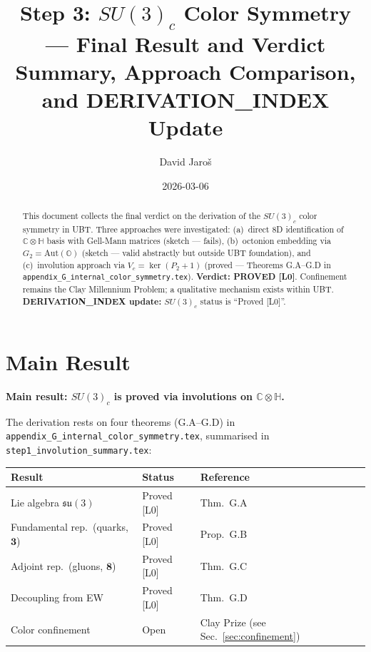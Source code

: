 \documentclass[12pt,a4paper]{article}
\title{\textbf{Step 3: $SU(3)_c$ Color Symmetry --- Final Result and Verdict}\\
         \large Summary, Approach Comparison, and DERIVATION\_INDEX Update}
\author{David Jaro\v{s}}
\date{2026-03-06}
\theoremstyle{definition}
\theoremstyle{remark}
\begin{document}
  \maketitle

  \begin{abstract}
  This document collects the final verdict on the derivation of the
  $SU(3)_c$ color symmetry in UBT.  Three approaches were investigated:
  (a)~direct 8D identification of $\mathbb{C}\otimes\mathbb{H}$ basis with
  Gell-Mann matrices (sketch --- fails), (b)~octonion embedding via
  $G_2 = \mathrm{Aut}(\mathbb{O})$ (sketch --- valid abstractly but outside
  UBT foundation), and (c)~involution approach via $V_c = \ker(P_2+1)$
  (proved --- Theorems G.A--G.D in \texttt{appendix\_G\_internal\_color\_symmetry.tex}).
  \textbf{Verdict: PROVED [L0]}.  Confinement remains the Clay Millennium
  Problem; a qualitative mechanism exists within UBT.
  \textbf{DERIVATION\_INDEX update:} $SU(3)_c$ status is ``Proved [L0]''.
  \end{abstract}
\fi

\section{Main Result}
\label{sec:main}

\begin{resultbox}
\textbf{Main result: $SU(3)_c$ is proved via involutions on $\mathbb{C}\otimes\mathbb{H}$.}

The derivation rests on four theorems (G.A--G.D) in
\texttt{appendix\_G\_internal\_color\_symmetry.tex}, summarised in
\texttt{step1\_involution\_summary.tex}:

\begin{center}
\begin{tabular}{lll}
  \toprule
  \textbf{Result} & \textbf{Status} & \textbf{Reference} \\
  \midrule
  Lie algebra $\mathfrak{su}(3)$ & Proved [L0] & Thm.~G.A \\
  Fundamental rep.\ (quarks, $\mathbf{3}$) & Proved [L0] & Prop.~G.B \\
  Adjoint rep.\ (gluons, $\mathbf{8}$) & Proved [L0] & Thm.~G.C \\
  Decoupling from EW & Proved [L0] & Thm.~G.D \\
  Color confinement & Open & Clay Prize (see Sec.~\ref{sec:confinement}) \\
  \bottomrule
\end{tabular}
\end{center}
\end{resultbox}
\end{document}
